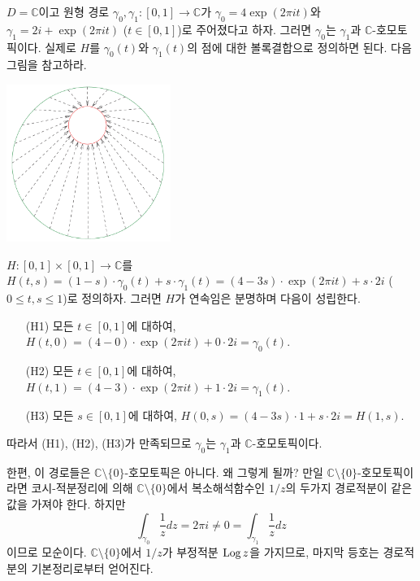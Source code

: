 \begin{saltexample}[label=example-3-8]{}{}
$D=\mathbb C$이고 원형 경로 $\gamma_0, \gamma_1 : [0,1] \to \mathbb C$가
$\gamma_0 = 4\exp(2\pi it)$와 $\gamma_1 = 2i+\exp(2\pi it)$ ($t\in[0,1]$)로 주어졌다고 하자.
그러면 $\gamma_0$는 $\gamma_1$과 $\mathbb C$-호모토픽이다.
실제로  $H$를 $\gamma_0(t)$와 $\gamma_1(t)$의 점에 대한 볼록결합으로 정의하면 된다.
다음 그림을 참고하라.

\begin{center}
\includegraphics[width=0.4\textwidth]{./SaltChapter/figs/fig-3-0-3}
\end{center}

$H:[0,1]\times [0,1] \to \mathbb C$를 
$H(t,s) = (1-s)\cdot \gamma_0(t) + s\cdot \gamma_1(t)
= (4-3s)\cdot \exp(2\pi it) + s\cdot 2i$ ($0\le t,s\le 1$)로 정의하자.
그러면 $H$가 연속임은 분명하며 다음이 성립한다.
\begin{itemize}
\item[(H1)] 모든 $t\in [0,1]$에 대하여, $H(t,0)= (4-0)\cdot \exp(2\pi it) + 0\cdot 2i = \gamma_0(t)$.
\item[(H2)] 모든 $t\in [0,1]$에 대하여, $H(t,1)= (4-3)\cdot \exp(2\pi it) + 1\cdot 2i = \gamma_1(t)$.
\item[(H3)] 모든 $s\in [0,1]$에 대하여, $H(0,s)= (4-3s)\cdot 1 + s\cdot 2i = H(1,s)$.
\end{itemize}
따라서 (H1), (H2), (H3)가 만족되므로 
$\gamma_0$는 $\gamma_1$과 $\mathbb C$-호모토픽이다.

한편, 이 경로들은 $\mathbb C\setminus \{0\}$-호모토픽은 아니다.
왜 그렇게 될까? 만일 $\mathbb C\setminus \{0\}$-호모토픽이라면
코시-적분정리에 의해 $\mathbb C\setminus \{0\}$에서 복소해석함수인
$1/z$의 두가지 경로적분이 같은 값을 가져야 한다. 하지만
\[
\int_{\gamma_0} \dfrac 1z dz = 2\pi i \ne 0 = \int_{\gamma_1} \dfrac 1z dz
\]
이므로 모순이다. 
$\mathbb C\setminus \{0\}$에서 $1/z$가 부정적분 $\mathop{\mathrm{Log}} z$을 가지므로,
마지막 등호는 경로적분의 기본정리로부터 얻어진다.
\end{saltexample}

